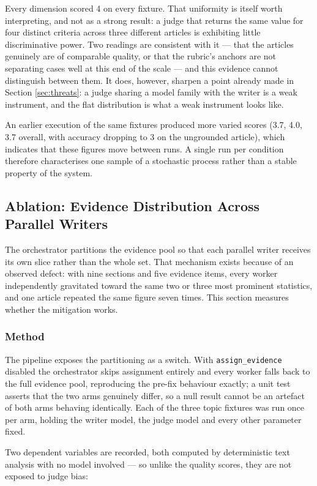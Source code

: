Every dimension scored 4 on every fixture. That uniformity is itself worth
interpreting, and not as a strong result: a judge that returns the same value
for four distinct criteria across three different articles is exhibiting little
discriminative power. Two readings are consistent with it --- that the articles
genuinely are of comparable quality, or that the rubric's anchors are not
separating cases well at this end of the scale --- and this evidence cannot
distinguish between them. It does, however, sharpen a point already made in
Section \ref{sec:threats}: a judge sharing a model family with the writer is a
weak instrument, and the flat distribution is what a weak instrument looks like.

An earlier execution of the same fixtures produced more varied scores (3.7,
4.0, 3.7 overall, with accuracy dropping to 3 on the ungrounded article), which
indicates that these figures move between runs. A single run per condition
therefore characterises one sample of a stochastic process rather than a stable
property of the system.

\subsection{Ablation: Evidence Distribution Across Parallel Writers}
\label{sec:ablation}

The orchestrator partitions the evidence pool so that each parallel writer
receives its own slice rather than the whole set. That mechanism exists because
of an observed defect: with nine sections and five evidence items, every worker
independently gravitated toward the same two or three most prominent
statistics, and one article repeated the same figure seven times. This section
measures whether the mitigation works.

\subsubsection{Method}
The pipeline exposes the partitioning as a switch. With
\texttt{assign\_evidence} disabled the orchestrator skips assignment entirely
and every worker falls back to the full evidence pool, reproducing the pre-fix
behaviour exactly; a unit test asserts that the two arms genuinely differ, so a
null result cannot be an artefact of both arms behaving identically. Each of the
three topic fixtures was run once per arm, holding the writer model, the judge
model and every other parameter fixed.

Two dependent variables are recorded, both computed by deterministic text
analysis with no model involved --- so unlike the quality scores, they are not
exposed to judge bias:

